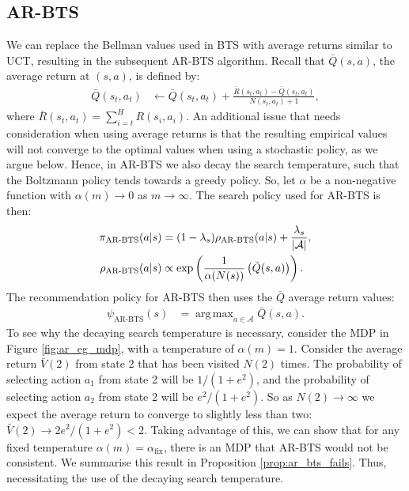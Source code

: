 \documentclass{article}
\newcommand{\cl}[1]{\mathcal{#1}}
\DeclareMathOperator*{\argmax}{arg\,max}
\theoremstyle{plain}
\begin{document}
\begin{appendices}
    \subsection{AR-BTS}
        We can replace the Bellman values used in BTS with average returns similar to UCT, resulting in the subsequent AR-BTS algorithm. Recall that $\bar{Q}(s,a)$, the average return at $(s,a)$, is defined by:
        \begin{align}
            \bar{Q}(s_t, a_t) &\leftarrow \bar{Q}(s_t, a_t) + \frac{\bar{R}(s_t,a_t) - \bar{Q}(s_t, a_t)}{N(s_t, a_t) + 1},  \label{appeq:average_return}
        \end{align}
        where $\bar{R}(s_t,a_t) = \sum_{i=t}^H R(s_i,a_i)$. An additional issue that needs consideration when using average returns is that the resulting empirical values will not converge to the optimal values when using a stochastic policy, as we argue below. Hence, in AR-BTS we also decay the search temperature, such that the Boltzmann policy tends towards a greedy policy. So, let $\alpha$ be a non-negative function with $\alpha(m)\rightarrow 0$ as $m\rightarrow \infty$. The search policy used for AR-BTS is then:
        \begin{align}
            \pi_{\textnormal{AR-BTS}}(a|s) &= (1-\lambda_s)\rho_{\textnormal{AR-BTS}}(a|s) + \frac{\lambda_s}{|\cl{A}|}, \\
            \rho_{\textnormal{AR-BTS}}(a|s) &\propto \exp\left(\frac{1}{\alpha(N(s))}\left(\bar{Q}(s,a)\right)\right). 
        \end{align}
        The recommendation policy for AR-BTS then uses the $\bar{Q}$ average return values:
        \begin{align}
            \psi_{\text{AR-BTS}}(s)&=\argmax_{a\in\cl{A}}\bar{Q}(s,a).
        \end{align}
        To see why the decaying search temperature is necessary, consider the MDP in Figure \ref{fig:ar_eg_mdp}, with a temperature of $\alpha(m)=1$. Consider the average return $\bar{V}(2)$ from state $2$ that has been visited $N(2)$ times. The probability of selecting action $a_1$ from state 2 will be $1/(1+e^2)$, and the probability of selecting action $a_2$ from state 2 will be $e^2/(1+e^2)$. So as $N(2)\rightarrow\infty$ we expect the average return to converge to slightly less than two: $\bar{V}(2)\rightarrow 2e^2/(1+e^2) < 2$. Taking advantage of this, we can show that for any fixed temperature $\alpha(m)=\alpha_{\text{fix}}$, there is an MDP that AR-BTS would not be consistent. We summarise this result in Proposition \ref{prop:ar_bts_fails}. Thus, necessitating the use of the decaying search temperature. 
        

\end{appendices}
\end{document}
